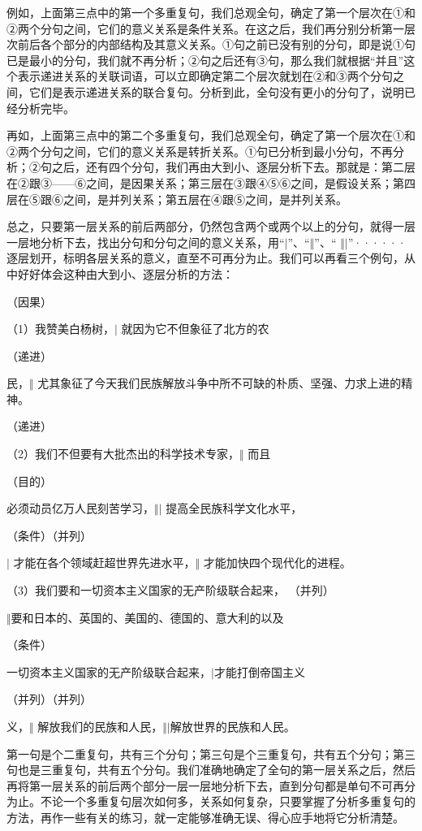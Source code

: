 例如，上面第三点中的第一个多重复句，我们总观全句，确定了第一个层次在①和②两个分句之间，它们的意义关系是条件关系。在这之后，我们再分别分析第一层次前后各个部分的内部结构及其意义关系。①句之前已没有别的分句，即是说①句已是最小的分句，我们就不再分析；②句之后还有③句，那么我们就根据“并且”这个表示递进关系的关联词语，可以立即确定第二个层次就划在②和③两个分句之间，它们是表示递进关系的联合复句。分析到此，全句没有更小的分句了，说明已经分析完毕。

再如，上面第三点中的第二个多重复句，我们总观全句，确定了第一个层次在①和②两个分句之间，它们的意义关系是转折关系。①句已分析到最小分句，不再分析；②句之后，还有四个分句，我们再由大到小、逐层分析下去。那就是：第二层在②跟③——⑥之间，是因果关系；第三层在③跟④⑤⑥之间，是假设关系；第四层在⑤跟⑥之间，是并列关系；第五层在④跟⑤之间，是并列关系。

总之，只要第一层关系的前后两部分，仍然包含两个或两个以上的分句，就得一层一层地分析下去，找出分句和分句之间的意义关系，用“$\vert$”、“$\Vert$”、“ $\Vert$$\vert$”······逐层划开，标明各层关系的意义，直至不可再分为止。我们可以再看三个例句，从中好好体会这种由大到小、逐层分析的方法：

\hspace{10em}（因果）

（1）我赞美白杨树，$\vert$ 就因为它不但象征了北方的农

\noindent
（递进）

\noindent
民，$\Vert$ 尤其象征了今天我们民族解放斗争中所不可缺的朴质、坚强、力求上进的精神。

\hspace{20em}（递进）

（2）我们不但要有大批杰出的科学技术专家，$\Vert$ 而且

\hspace{9em}（目的）

\noindent
必须动员亿万人民刻苦学习，$\Vert$$\vert$ 提高全民族科学文化水平，

\noindent
（条件）\hspace{12em}（并列）

$\vert$ 才能在各个领域赶超世界先进水平，$\Vert$ 才能加快四个现代化的进程。

（3）我们要和一切资本主义国家的无产阶级联合起来，
\newpage
（并列）

$\Vert$要和日本的、英国的、美国的、德国的、意大利的以及

（条件）

一切资本主义国家的无产阶级联合起来，$\vert$才能打倒帝国主义

\hspace{2em}（并列）\hspace{8em}（并列）

义，$\Vert$ 解放我们的民族和人民，$\Vert$$\vert$解放世界的民族和人民。

第一句是个二重复句，共有三个分句；第三句是个三重复句，共有五个分句；第三句也是三重复句，共有五个分句。我们准确地确定了全句的第一层关系之后，然后再将第一层关系的前后两个部分一层一层地分析下去，直到分句都是单句不可再分为止。不论一个多重复句层次如何多，关系如何复杂，只要掌握了分析多重复句的方法，再作一些有关的练习，就一定能够准确无误、得心应手地将它分析清楚。
\newpage
